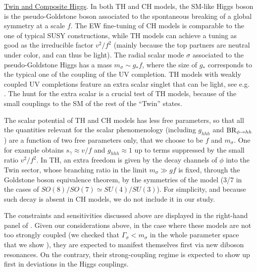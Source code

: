 \underline{Twin and Composite Higgs}.
In both TH and CH models, the SM-like Higgs boson is the pseudo-Goldstone boson associated to the spontaneous breaking of a global symmetry at a scale $f$. The EW fine-tuning of CH models is comparable to the one of typical SUSY constructions, while TH models can achieve a tuning as good as the irreducible factor $v^2/f^2$ (mainly because the top partners are neutral under color, and can thus be light).
The radial scalar mode $\sigma$ associated to the pseudo-Goldstone Higgs has a mass $m_\sigma \sim g_* f$, where the size of $g_*$ corresponds to the typical one of the coupling of the UV completion.
TH models with weakly coupled UV completions
feature an extra scalar singlet that can be light, see e.g. .
The hunt for the extra scalar is a crucial test of TH models, because of the small couplings to the SM of the rest of the ``Twin'' states.

The scalar potential of TH and CH models has less free parameters, so that all the quantities relevant for the scalar phenomenology (including $g_{hhh}$ and ${\rm BR}_{\phi \to hh}$) are a function of two free parameters only, that we choose to be $f$ and $m_\sigma$.
One for example obtains $s_\gamma \approx v/f$ and  $g_{hhh} \approx 1$ up to terms suppressed by the small ratio $v^2/f^2$.
In TH, an extra freedom is given by the decay channels of $\phi$ into the Twin sector, whose branching ratio in the limit $m_\sigma \gg g f$ is fixed, through the Goldstone boson equivalence theorem, by the symmetries of the model (3/7 in the cases of $SO(8)/SO(7) \simeq SU(4)/SU(3)$). For simplicity, and because such decay is absent in CH models, we do not include it in our study.

The constraints and sensitivities discussed 
above
are displayed in the right-hand panel of .
Given our considerations above, in the case where these models are not too strongly coupled (we checked that $\Gamma_\sigma < m_\sigma$ in the whole parameter space that we show ), they are expected to manifest themselves first via new diboson resonances. On the contrary, their strong-coupling regime is expected to show up first in deviations in the Higgs couplings.




